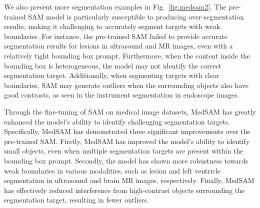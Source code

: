 \documentclass[runningheads]{llncs}
\begin{document}
We also present more segmentation examples in Fig.~\ref{fig:medsam2}. The pre-trained SAM model is particularly susceptible to producing over-segmentation results, making it challenging to accurately segment targets with weak boundaries. For instance, the pre-trained SAM failed to provide accurate segmentation results for lesions in ultrasound and MR images, even with a relatively tight bounding box prompt. Furthermore, when the content inside the bounding box is heterogeneous, the model may not identify the correct segmentation target. Additionally, when segmenting targets with clear boundaries, SAM may generate outliers when the surrounding objects also have good contrasts, as seen in the instrument segmentation in endoscope images.


Through the fine-tuning of SAM on medical image datasets, MedSAM has greatly enhanced the model's ability to identify challenging segmentation targets. Specifically, MedSAM has demonstrated three significant improvements over the pre-trained SAM. Firstly, MedSAM has improved the model's ability to identify small objects, even when multiple segmentation targets are present within the bounding box prompt. Secondly, the model has shown more robustness towards weak boundaries in various modalities, such as lesion and left ventricle segmentation in ultrasound and brain MR images, respectively. Finally, MedSAM has effectively reduced interference from high-contrast objects surrounding the segmentation target, resulting in fewer outliers.
\end{document}

